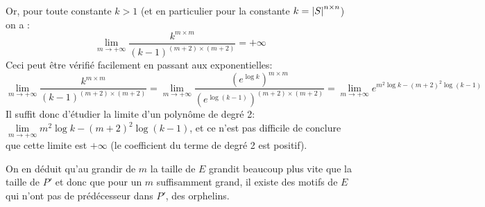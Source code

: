 \begin{proofI}
\begin{itemize}
		      Or, pour toute  constante $k > 1$ (et en particulier pour la constante $k=\left|S\right|  ^{n \times n}$) on a :
		      $$\lim\limits_{m \rightarrow +\infty} \frac{k^{m \times m }}{(k-1)^{(m + 2) \times (m + 2)}}= +\infty$$
		      Ceci peut être vérifié facilement en passant  aux exponentielles:
		      $$\lim\limits_{m \rightarrow +\infty} \frac{k^{m \times m }}{(k-1)^{(m + 2) \times (m + 2)}}=
			      \lim\limits_{m \rightarrow +\infty} \frac{(e^{\log k})^{m \times m }}{(e^{\log (k-1)})^{(m + 2) \times (m + 2)}}=
			      \lim\limits_{m \rightarrow +\infty} e^{m^2\log k - (m+2)^2\log (k-1)} $$
		      Il suffit donc d'étudier la limite d'un polynôme de degré 2:
		      $ \lim\limits_{m \rightarrow +\infty} m^2\log k - (m+2)^2\log (k-1)$,  et ce n'est pas difficile de conclure que cette
		      limite est $+\infty$ (le coefficient du terme de degré 2 est positif).


		      On en déduit qu'au grandir de $m$ la taille de $E$ grandit beaucoup plus vite que la taille de $P'$
		      et donc  que pour un $m$
		      suffisamment grand, il existe des motifs de $E$ qui n'ont pas de prédécesseur dans $P'$, \cad des orphelins.
	\end{itemize}
\end{proofI}
